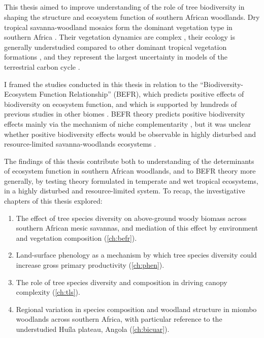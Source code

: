 \begin{refsection}


\chapter{\chaptertitle}
\label{ch:discussion}

This thesis aimed to improve understanding of the role of tree biodiversity in shaping the structure and ecosystem function of southern African woodlands. Dry tropical savanna-woodland mosaics form the dominant vegetation type in southern Africa \citep{Arino2010}. Their vegetation dynamics are complex \citep{Scholes1997}, their ecology is generally understudied compared to other dominant tropical vegetation formations \citep{Hill2010}, and they represent the largest uncertainty in models of the terrestrial carbon cycle \citep{Sitch2015}.

I framed the studies conducted in this thesis in relation to the ``Biodiversity-Ecosystem Function Relationship'' (BEFR), which predicts positive effects of biodiversity on ecosystem function, and which is supported by hundreds of previous studies in other biomes \citep{Liang2016}. BEFR theory predicts positive biodiversity effects mainly via the mechanism of niche complementarity \citep{Cardinale2009}, but it was unclear whether positive biodiversity effects would be observable in highly disturbed and resource-limited savanna-woodlands ecosystems \citep{Tilman2014}. 

The findings of this thesis contribute both to understanding of the determinants of ecosystem function in southern African woodlands, and to BEFR theory more generally, by testing theory formulated in temperate and wet tropical ecosystems, in a highly disturbed and resource-limited system. To recap, the investigative chapters of this thesis explored: 

\begin{enumerate}
	\item{The effect of tree species diversity on above-ground woody biomass across southern African mesic savannas, and mediation of this effect by environment and vegetation composition (\autoref{ch:befr}).}
	\item{Land-surface phenology as a mechanism by which tree species diversity could increase gross primary productivity (\autoref{ch:phen}).}
	\item{The role of tree species diversity and composition in driving canopy complexity (\autoref{ch:tls}).}
	\item{Regional variation in species composition and woodland structure in miombo woodlands across southern Africa, with particular reference to the understudied Hu\'{i}la plateau, Angola (\autoref{ch:bicuar}).}
\end{enumerate}


\end{refsection}
